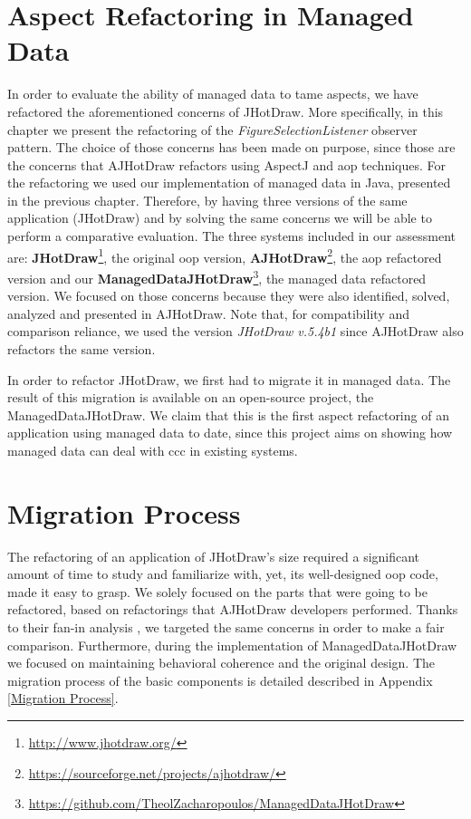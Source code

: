 \section{Aspect Refactoring in Managed Data}
In order to evaluate the ability of managed data to tame aspects, we have refactored the aforementioned concerns of JHotDraw.
More specifically, in this chapter we present the refactoring of the \textit{FigureSelectionListener} observer pattern.
The choice of those concerns has been made on purpose, since those are the concerns that AJHotDraw refactors using AspectJ and \ac{aop} techniques.
For the refactoring we used our implementation of managed data in Java, presented in the previous chapter.
Therefore, by having three versions of the same application (JHotDraw) and by solving the same concerns we will be able to perform a comparative evaluation.
The three systems included in our assessment are: \textbf{JHotDraw}\footnote{\url{http://www.jhotdraw.org/}}, the original \ac{oop} version, \textbf{AJHotDraw}\footnote{\url{https://sourceforge.net/projects/ajhotdraw/}}, the \ac{aop} refactored version and our \textbf{ManagedDataJHotDraw}\footnote{\url{https://github.com/TheolZacharopoulos/ManagedDataJHotDraw}}, the managed data refactored version.
We focused on those concerns because they were also identified, solved, analyzed and presented in AJHotDraw.
Note that, for compatibility and comparison reliance, we used the version \textit{JHotDraw v.5.4b1} since AJHotDraw also refactors the same version.

In order to refactor JHotDraw, we first had to migrate it in managed data.
The result of this migration is available on an open-source project, the ManagedDataJHotDraw.
We claim that this is the first aspect refactoring of an application using managed data to date, since this project aims on showing how managed data can deal with \ac{ccc} in existing systems.

\section{Migration Process}\label{Migration}
The refactoring of an application of JHotDraw's size required a significant amount of time to study and familiarize with, yet, its well-designed \ac{oop} code, made it easy to grasp.
We solely focused on the parts that were going to be refactored, based on refactorings that AJHotDraw developers \cite{marinajhotdraw} performed.
Thanks to their fan-in analysis \cite{marin2004identifying}, we targeted the same concerns in order to make a fair comparison.
Furthermore, during the implementation of ManagedDataJHotDraw we focused on maintaining behavioral coherence and the original design.
The migration process of the basic components is detailed described in Appendix \ref{Migration Process}.

